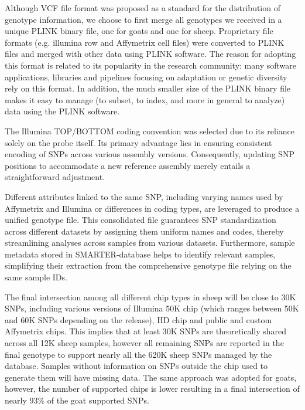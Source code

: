 \documentclass[a4paper,num-refs,gigabyte]{oup-contemporary}
\begin{document}
Although VCF\citep{Danecek2011} file format was proposed as a standard for the distribution of genotype information, we choose to first merge all genotypes we received in a unique PLINK binary file, one for goats and one for sheep. Proprietary file formats (e.g. illumina row and Affymetrix cell files) were converted to PLINK files and merged with other data using PLINK\citep{Purcell2007} software. The reason for adopting this format is related to its popularity in the research community: many software applications, libraries and pipelines focusing on adaptation or genetic diversity rely on this format. In addition, the much smaller size of the PLINK binary file makes it easy to manage (to subset, to index, and more in general to analyze) data using the PLINK software.

The Illumina TOP/BOTTOM coding convention was selected due to its reliance solely on the probe itself\citep{IlluminaTOP}. Its primary advantage lies in ensuring consistent encoding of SNPs across various assembly versions. Consequently, updating SNP positions to accommodate a new reference assembly merely entails a straightforward adjustment.

Different attributes linked to the same SNP, including varying names used by Affymetrix and Illumina or differences in coding types, are leveraged to produce a unified genotype file. This consolidated file guarantees SNP standardization across different datasets by assigning them uniform names and codes, thereby streamlining analyses across samples from various datasets. Furthermore, sample metadata stored in SMARTER-database helps to identify relevant samples, simplifying their extraction from the comprehensive genotype file relying on the same sample IDs.

The final intersection among all different chip types in sheep will be close to 30K SNPs, including various versions of Illumina 50K chip (which ranges between 50K and 60K SNPs depending on the release), HD chip and public and custom Affymetrix chips. This implies that at least 30K SNPs are theoretically shared across all 12K sheep samples, however all remaining SNPs are reported in the final genotype to support nearly all the 620K sheep SNPs managed by the database. Samples without information on SNPs outside the chip used to generate them will have missing data. The same approach was adopted for goats, however, the number of supported chips is lower resulting in a final intersection of nearly 93\% of the goat supported SNPs.
\end{document}

